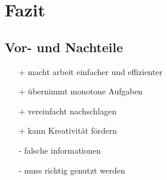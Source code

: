 \chapter{Fazit}
\label{chap:fazit}

\section{Vor- und Nachteile}
\citep{GitHub}
\begin{itemize}
    \item[+] macht arbeit einfacher und effizienter
    \item[+] übernimmt monotone Aufgaben
    \item[+] vereinfacht nachschlagen
    \item[+] kann Kreativität fördern
    \item[-] falsche informationen
    \item[-] muss richtig genutzt werden
\end{itemize}